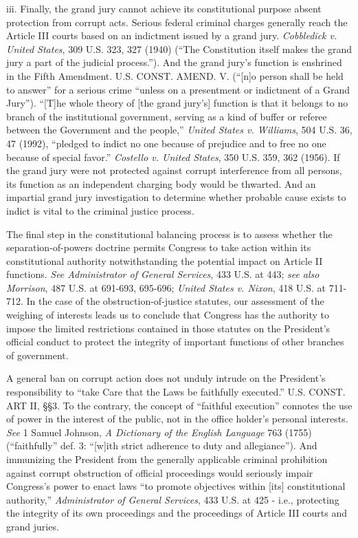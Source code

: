 iii. Finally, the grand jury cannot achieve its constitutional purpose absent protection from corrupt acts.
Serious federal criminal charges generally reach the Article III courts based on an indictment issued by a grand jury.
\textit{Cobbledick v. United States}, 309 U.S. 323, 327 (1940) (“The Constitution itself makes the grand jury a part of the judicial process.”).
And the grand jury’s function is enshrined in the Fifth Amendment.
U.S. CONST. AMEND. V. (“[n]o person shall be held to answer” for a serious crime “unless on a presentment or indictment of a Grand Jury”).
“[T]he whole theory of [the grand jury’s] function is that it belongs to no branch of the institutional government, serving as a kind of buffer or referee between the Government and the people,” \textit{United States v. Williams}, 504 U.S. 36, 47 (1992), “pledged to indict no one because of prejudice and to free no one because of special favor.”
\textit{Costello v. United States}, 350 U.S. 359, 362 (1956).
If the grand jury were not protected against corrupt interference from all persons, its function as an independent charging body would be thwarted.
And an impartial grand jury investigation to determine whether probable cause exists to indict is vital to the criminal justice process.

\hr

The final step in the constitutional balancing process is to assess whether the separation-of-powers doctrine permits Congress to take action within its constitutional authority notwithstanding the potential impact on Article II functions.
\textit{See Administrator of General Services}, 433 U.S. at 443;
\textit{see also Morrison}, 487 U.S. at 691-693, 695-696;
\textit{United States v. Nixon}, 418 U.S. at 711-712.
In the case of the obstruction-of-justice statutes, our assessment of the weighing of interests leads us to conclude that Congress has the authority to impose the limited restrictions contained in those statutes on the President’s official conduct to protect the integrity of important functions of other branches of government.

A general ban on corrupt action does not unduly intrude on the President’s responsibility to “take Care that the Laws be faithfully executed.”
U.S. CONST. ART II, \S\S 3.%
To the contrary, the concept of “faithful execution” connotes the use of power in the interest of the public, not in the office holder’s personal interests.
\textit{See} 1 Samuel Johnson, \textit{A Dictionary of the English Language} 763 (1755) (“faithfully” def. 3: “[w]ith strict adherence to duty and allegiance”).
And immunizing the President from the generally applicable criminal prohibition against corrupt obstruction of official proceedings would seriously impair Congress’s power to enact laws “to promote objectives within [its] constitutional authority,” \textit{Administrator of General Services}, 433 U.S. at 425 - i.e., protecting the integrity of its own proceedings and the proceedings of Article III courts and grand juries.


